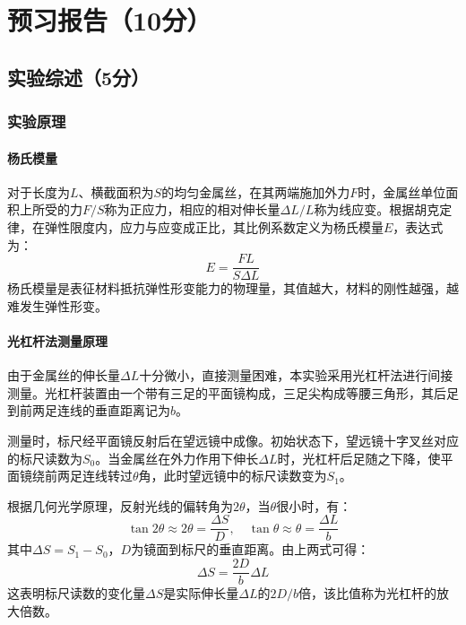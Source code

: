 \documentclass[]{../../templates/Report}%
\begin{document}
\maketitle%

\section{预习报告（10分）}
\subsection{实验综述（5分）}
\subsubsection{实验原理}
\paragraph{杨氏模量}
对于长度为$L$、横截面积为$S$的均匀金属丝，在其两端施加外力$F$时，金属丝单位面积上所受的力$F/S$称为正应力，相应的相对伸长量$\Delta L/L$称为线应变。根据胡克定律，在弹性限度内，应力与应变成正比，其比例系数定义为杨氏模量$E$，表达式为：
\begin{equation}
E = \frac{FL}{S\Delta L}
\end{equation}
杨氏模量是表征材料抵抗弹性形变能力的物理量，其值越大，材料的刚性越强，越难发生弹性形变。

\paragraph{光杠杆法测量原理}
由于金属丝的伸长量$\Delta L$十分微小，直接测量困难，本实验采用光杠杆法进行间接测量。光杠杆装置由一个带有三足的平面镜构成，三足尖构成等腰三角形，其后足到前两足连线的垂直距离记为$b$。

测量时，标尺经平面镜反射后在望远镜中成像。初始状态下，望远镜十字叉丝对应的标尺读数为$S_0$。当金属丝在外力作用下伸长$\Delta L$时，光杠杆后足随之下降，使平面镜绕前两足连线转过$\theta$角，此时望远镜中的标尺读数变为$S_1$。

根据几何光学原理，反射光线的偏转角为$2\theta$，当$\theta$很小时，有：
\begin{equation}
\tan 2\theta \approx 2\theta = \frac{\Delta S}{D}, \quad \tan \theta \approx \theta = \frac{\Delta L}{b}
\end{equation}
其中$\Delta S = S_1 - S_0$，$D$为镜面到标尺的垂直距离。由上两式可得：
\begin{equation}
\Delta S = \frac{2D}{b}\Delta L
\end{equation}
这表明标尺读数的变化量$\Delta S$是实际伸长量$\Delta L$的$2D/b$倍，该比值称为光杠杆的放大倍数。
\end{document}
